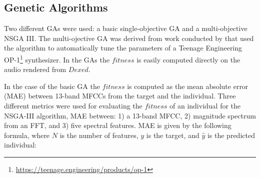 







\subsection{Genetic Algorithms}
Two different GAs were used: a basic single-objective GA and a multi-objective NSGA III. The multi-ojective GA was derived from work conducted by \cite{macret2012automatic} that used the algorithm to automatically tune the parameters of a Teenage Engineering OP-1\footnote{\url{https://teenage.engineering/products/op-1}} synthesizer. In the GAs the $fitness$ is easily computed directly on the audio rendered from $Dexed$.

In the case of the basic GA the $fitness$ is computed as the mean absolute error (MAE) between 13-band MFCCs from the target and the individual. Three different metrics were used for evaluating the $fitness$ of an individual for the NSGA-III algorithm, MAE between: 1) a 13-band MFCC, 2) magnitude spectrum from an FFT, and 3) five spectral features. MAE is given by the following formula, where $N$ is the number of features, $y$ is the target, and $\hat{y}$ is the predicted individual:

